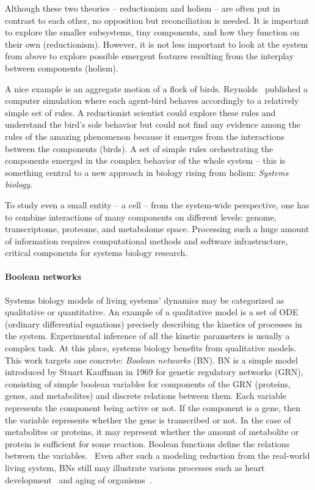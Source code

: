 \documentclass[
	digital, oneside, nosansbold, nocolorbold, nolot, nolof
]{fithesis4}
\begin{document}
Although these two theories -- reductionism and holism -- are often put in
contrast to each other, no opposition but reconciliation is needed. It is
important to explore the smaller subsystems, tiny components, and how they
function on their own (reductionism). However, it is not less important to look
at the system from above to explore possible emergent features resulting from
the interplay between components (holism).~\cite{systems_bio_hist}

A nice example is an aggregate motion of a flock of birds.
Reynolds~\cite{reynolds_flock} published a computer simulation where each
agent-bird behaves accordingly to a relatively simple set of rules. A
reductionist scientist could explore these rules and understand the bird's sole
behavior but could not find any evidence among the rules of the amazing
phenomenon because it emerges from the interactions between the components
(birds). A set of simple rules orchestrating the components emerged in the
complex behavior of the whole system -- this is something central to a new
approach in biology rising from holism: \emph{Systems biology}.

To study even a small entity -- a cell -- from the system-wide perspective, one
has to combine interactions of many components on different levels: genome,
transcriptome, proteome, and metabolome space. Processing such a huge amount of
information requires computational methods and software infrastructure,
critical components for systems biology research.~\cite{kitano_overview,
systems_bio_methods}

\paragraph{Boolean networks}

Systems biology models of living systems' dynamics may be categorized as
qualitative or quantitative. An example of a qualitative model is a set of ODE
(ordinary differential equations) precisely describing the kinetics of
processes in the system. Experimental inference of all the kinetic parameters
is usually a complex task. At this place, systems biology benefits from
qualitative models. This work targets one concrete: \emph{Boolean networks}
(BN). BN is a simple model introduced by Stuart Kauffman in 1969 for genetic
regulatory networks (GRN), consisting of simple boolean variables for
components of the GRN (proteins, genes, and metabolites) and discrete relations
between them.  Each variable represents the component being active or not. If
the component is a gene, then the variable represents whether the gene is
transcribed or not. In the case of metabolites or proteins, it may represent
whether the amount of metabolite or protein is sufficient for some reaction.
Boolean functions define the relations between the
variables.~\cite{concepts_bn} Even after such a modeling reduction from the
real-world living system, BNs still may illustrate various processes such as
heart development~\cite{heart_development} and aging of organisms~\cite{aging}.
\end{document}
